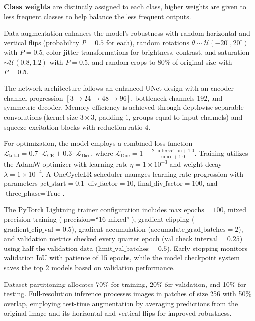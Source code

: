\documentclass[final]{cmpreport_02}
\begin{document}
\textbf{Class weights} are distinctly assigned to each class, higher weights are given to less frequent classes to help balance the less frequent outputs.

Data augmentation enhances the model's robustness with random horizontal and vertical flips (probability $P = 0.5$ for each), random rotations $\theta \sim \mathcal{U}(-20^{\circ}, 20^{\circ})$ with $P = 0.5$, color jitter transformations for brightness, contrast, and saturation $\sim \mathcal{U}(0.8, 1.2)$ with $P = 0.5$, and random crops to 80\% of original size with $P = 0.5$.

The network architecture follows an enhanced UNet design with an encoder channel progression $[3 \rightarrow 24 \rightarrow 48 \rightarrow 96]$, bottleneck channels $192$, and symmetric decoder. Memory efficiency is achieved through depthwise separable convolutions (kernel size $3 \times 3$, padding $1$, groups equal to input channels) and squeeze-excitation blocks with reduction ratio $4$.

For optimization, the model employs a combined loss function $\mathcal{L}_{\text{total}} = 0.7 \cdot \mathcal{L}_{\text{CE}} + 0.3 \cdot \mathcal{L}_{\text{Dice}}$, where $\mathcal{L}_{\text{Dice}} = 1 - \frac{2 \cdot \text{intersection} + 1.0}{\text{union} + 1.0}$. Training utilizes the AdamW optimizer with learning rate $\eta = 1 \times 10^{-3}$ and weight decay $\lambda = 1 \times 10^{-4}$. A OneCycleLR scheduler manages learning rate progression with parameters $\text{pct\_start} = 0.1$, $\text{div\_factor} = 10$, $\text{final\_div\_factor} = 100$, and $\text{three\_phase} = \text{True}$.

The PyTorch Lightning trainer configuration includes $\text{max\_epochs} = 100$, mixed precision training ($\text{precision} = \text{``16-mixed''}$), gradient clipping ($\text{gradient\_clip\_val} = 0.5$), gradient accumulation ($\text{accumulate\_grad\_batches} = 2$), and validation metrics checked every quarter epoch ($\text{val\_check\_interval} = 0.25$) using half the validation data ($\text{limit\_val\_batches} = 0.5$). Early stopping monitors validation IoU with patience of 15 epochs, while the model checkpoint system saves the top 2 models based on validation performance.

Dataset partitioning allocates 70\% for training, 20\% for validation, and 10\% for testing. Full-resolution inference processes images in patches of size 256 with 50\% overlap, employing test-time augmentation by averaging predictions from the original image and its horizontal and vertical flips for improved robustness.
\end{document}
